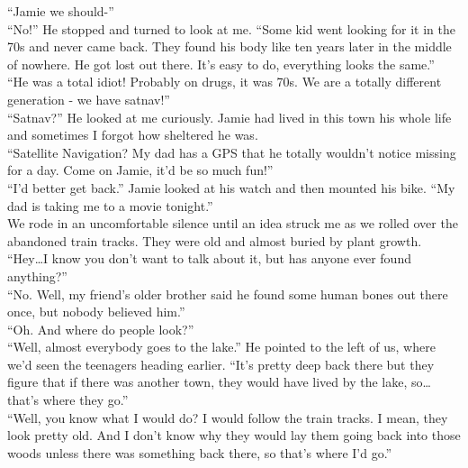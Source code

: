 \documentclass[a5paper]{scrartcl}
\begin{document}
\enquote{Jamie we should-}\\


\enquote{No!} He stopped and turned to look at me. \enquote{Some kid went looking for it in the 70s and never came back. They found his body like ten years later in the middle of nowhere. He got lost out there. It's easy to do, everything looks the same.}\\


\enquote{He was a total idiot! Probably on drugs, it was 70s. We are a totally different generation - we have satnav!}\\

\enquote{Satnav?} He looked at me curiously. Jamie had lived in this 
town his whole life and sometimes I forgot how sheltered he was.\\

\enquote{Satellite Navigation? My dad has a GPS that he totally wouldn't notice missing for a day. Come on Jamie, it'd be so much fun!}\\


\enquote{I'd better get back.} Jamie looked at his watch and then mounted his bike. \enquote{My dad is taking me to a movie tonight.} \\


We rode in an uncomfortable silence until an idea struck me as we rolled over the abandoned train tracks. They were old and almost buried by plant growth. \\


\enquote{Hey\dots I know you don't want to talk about it, but has anyone ever found anything?}\\


\enquote{No. Well, my friend's older brother said he found some human bones out there once, but nobody believed him.}\\


\enquote{Oh. And where do people look?}\\


\enquote{Well, almost everybody goes to the lake.} He pointed to the left of us, where we'd seen the teenagers heading earlier. \enquote{It's pretty deep back there but they figure that if there was another town, they would have lived by the lake, so\dots that's where they go.}   \\


\enquote{Well, you know what I would do? I would follow the train tracks. I mean, they look pretty old. And I don't know why they would lay them going back into those woods unless there was something back there, so that's where I'd go.}\\
\end{document}
